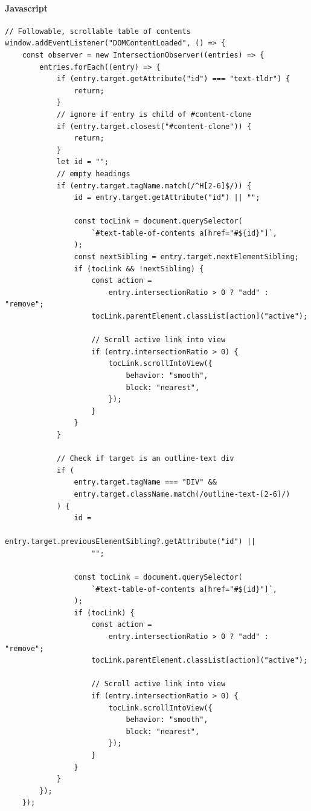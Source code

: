\documentclass[11pt]{article}
\begin{document}
\paragraph{Javascript}
\label{sec:org94595c3}
\begin{verbatim}
// Followable, scrollable table of contents
window.addEventListener("DOMContentLoaded", () => {
    const observer = new IntersectionObserver((entries) => {
        entries.forEach((entry) => {
            if (entry.target.getAttribute("id") === "text-tldr") {
                return;
            }
            // ignore if entry is child of #content-clone
            if (entry.target.closest("#content-clone")) {
                return;
            }
            let id = "";
            // empty headings
            if (entry.target.tagName.match(/^H[2-6]$/)) {
                id = entry.target.getAttribute("id") || "";

                const tocLink = document.querySelector(
                    `#text-table-of-contents a[href="#${id}"]`,
                );
                const nextSibling = entry.target.nextElementSibling;
                if (tocLink && !nextSibling) {
                    const action =
                        entry.intersectionRatio > 0 ? "add" : "remove";
                    tocLink.parentElement.classList[action]("active");

                    // Scroll active link into view
                    if (entry.intersectionRatio > 0) {
                        tocLink.scrollIntoView({
                            behavior: "smooth",
                            block: "nearest",
                        });
                    }
                }
            }

            // Check if target is an outline-text div
            if (
                entry.target.tagName === "DIV" &&
                entry.target.className.match(/outline-text-[2-6]/)
            ) {
                id =
                    entry.target.previousElementSibling?.getAttribute("id") ||
                    "";

                const tocLink = document.querySelector(
                    `#text-table-of-contents a[href="#${id}"]`,
                );
                if (tocLink) {
                    const action =
                        entry.intersectionRatio > 0 ? "add" : "remove";
                    tocLink.parentElement.classList[action]("active");

                    // Scroll active link into view
                    if (entry.intersectionRatio > 0) {
                        tocLink.scrollIntoView({
                            behavior: "smooth",
                            block: "nearest",
                        });
                    }
                }
            }
        });
    });


\end{verbatim}
\end{document}
